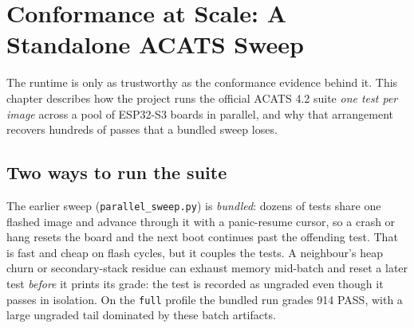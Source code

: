 \chapter{Conformance at Scale: A Standalone ACATS Sweep}
\label{ch:acats-sweep}

The runtime is only as trustworthy as the conformance evidence behind it. This
chapter describes how the project runs the official ACATS 4.2 suite \emph{one test
per image} across a pool of ESP32-S3 boards in parallel, and why that arrangement
recovers hundreds of passes that a bundled sweep loses.

\medskip
\noindent{}
\medskip

\section{Two ways to run the suite}

The earlier sweep (\texttt{parallel\_sweep.py}) is \emph{bundled}: dozens of tests
share one flashed image and advance through it with a panic-resume cursor, so a
crash or hang resets the board and the next boot continues past the offending test.
That is fast and cheap on flash cycles, but it couples the tests. A neighbour's
heap churn or secondary-stack residue can exhaust memory mid-batch and reset a later
test \emph{before} it prints its grade: the test is recorded as ungraded even
though it passes in isolation. On the \texttt{full} profile the bundled run grades
914 PASS, with a large ungraded tail dominated by these batch artifacts.


